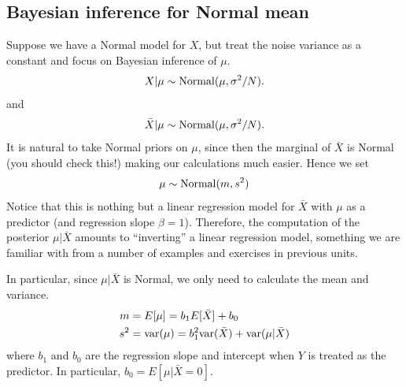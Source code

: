 \begin{example}
\begin{enumerate}[label=(\alph*)]
\end{enumerate}

\end{example}


\subsection{Bayesian inference for Normal mean}\label{eq:bayesnormal}

Suppose we have a Normal model for $X$, but treat the noise variance as a constant and focus on Bayesian inference of $\mu$. 
\begin{equation*}
X|\mu \sim {\rm Normal}(\mu,\sigma^2/N).
\end{equation*}
and
\begin{equation*}
\bar{X}|\mu \sim {\rm Normal}(\mu,\sigma^2/N).
\end{equation*}
It is natural to take Normal priors on $\mu$, since then the marginal of $\bar{X}$ is Normal (you should check this!) making our calculations much easier. Hence we set 
\begin{equation*}
\mu \sim {\rm Normal}(m,s^2)
\end{equation*}
Notice that this is nothing but a linear regression model for $\bar{X}$ with $\mu$ as a predictor (and regression slope $\beta =1$). Therefore, the computation of the posterior $\mu|\bar{X}$ amounts to ``inverting'' a linear regression model, something we are familiar with from a number of examples and exercises in previous units. 

In particular, since $\mu|\bar{X}$ is Normal, we only need to calculate the mean and variance.  
\begin{align}
m &= E[\mu] =  b_1 E[\bar{X}] + b_0\\
s^2 &= {\rm var}(\mu) =b_1^2 {\rm var}(\bar{X}) + {\rm var}(\mu|\bar{X})
\end{align}
where $b_1$ and $b_0$ are the regression slope and intercept when $Y$ is treated as the predictor. In particular, $b_0 = E[\mu|\bar{X}=0]$. 

